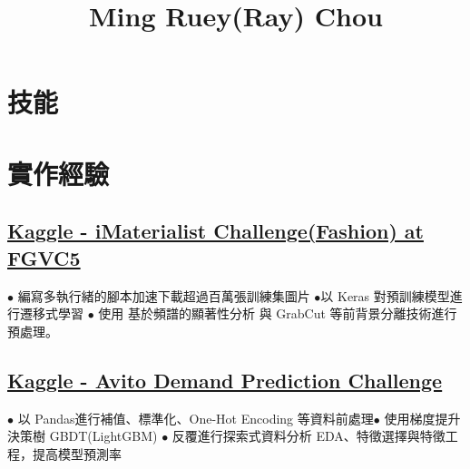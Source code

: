 \documentclass[11pt,a4paper]{moderncv}
\title{Ming Ruey(Ray) Chou}
\begin{document}
\maketitle
\vspace*{-14mm}

\section{技能}
\vspace{-0.6\baselineskip}

\section{實作經驗}

\subsection{\href{https://www.kaggle.com/c/imaterialist-challenge-fashion-2018}{Kaggle - iMaterialist Challenge(Fashion) at FGVC5}}
{\footnotesize{$\bullet$ 編寫多執行緒的腳本加速下載超過百萬張訓練集圖片\space\space 
$\bullet$以 Keras 對預訓練模型進行遷移式學習 \newline $\bullet$ 使用 基於頻譜的顯著性分析 與 GrabCut 等前背景分離技術進行預處理。}}

\subsection{\href{https://www.kaggle.com/c/avito-demand-prediction}{Kaggle - Avito Demand Prediction Challenge}}
{\footnotesize{$\bullet$ 以 Pandas進行補值、標準化、One-Hot Encoding 等資料前處理\space\space $\bullet$ 使用梯度提升決策樹 GBDT(LightGBM) 
\newline $\bullet$ 反覆進行探索式資料分析 EDA、特徵選擇與特徵工程，提高模型預測率}}
\end{document}
